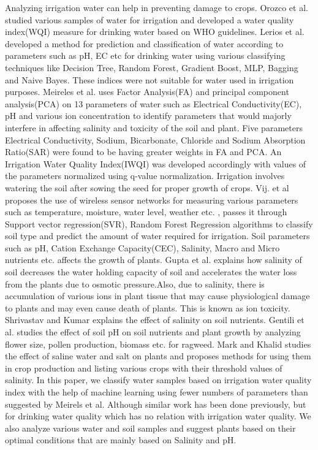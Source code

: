 Analyzing irrigation water can help in preventing damage to crops. Orozco et al.\cite{article:agricultureWQI} studied various samples of water for irrigation and developed a water quality index(WQI) measure for drinking water based on WHO guidelines. Lerios et al.\cite{article:patternExtraction} developed a method for prediction and classification of water according to parameters such as pH, EC etc for drinking water using various classifying techniques like Decision Tree\cite{article:decisionTree}, Random Forest\cite{article:randomForest}, Gradient Boost\cite{article:gradientBoosting}, MLP\cite{book:ann}, Bagging\cite{article:baggingClassifier} and Naive Bayes\cite{article:naiveBayes}. These indices were not suitable for water used in irrigation purposes. Meireles et al.\cite{article:agricultureWQI} uses Factor Analysis(FA) and principal component analysis(PCA) on 13 parameters of water such as Electrical Conductivity(EC), pH and various ion concentration to identify parameters that would majorly interfere in affecting salinity and toxicity of the soil and plant. Five parameters Electrical Conductivity, Sodium, Bicarbonate, Chloride and Sodium Absorption Ratio(SAR) were found to be having greater weights in FA and PCA. An Irrigation Water Quality Index(IWQI) was developed accordingly with values of the parameters normalized using q-value normalization. Irrigation involves watering the soil after sowing the seed for proper growth of crops. Vij. et al\cite{article:vijIot} proposes the use of wireless sensor networks for measuring various parameters such as temperature, moisture, water level, weather etc. , passes it through Support vector regression(SVR), Random Forest Regression algorithms to classify soil type and predict the amount of water required for irrigation. 
Soil parameters such as pH, Cation Exchange Capacity(CEC), Salinity, Macro and Micro nutrients etc. affects the growth of plants. Gupta et al.\cite{article:mechSalinity} explains how salinity of soil decreases the water holding capacity of soil and accelerates the water loss from the plants due to osmotic pressure.Also, due to salinity,  there is accumulation of various ions in plant tissue that may cause physiological damage to plants and may even cause death of plants. This is known as ion toxicity. Shrivastav and Kumar\cite{article:shrivastavSalinity} explains the effect of salinity on soil nutrients. Gentili et al.\cite{article:plantwithph} studies the effect of soil pH on soil nutrients and plant growth by analyzing flower size, pollen production, biomass etc. for ragweed. Mark and Khalid\cite{article:water&soilwithconductivity} studies the effect of saline water and salt on plants and proposes methods for using them in crop production and listing various crops with their threshold values of salinity. 
In this paper, we classify water samples based on irrigation water quality index with the help of machine learning using  fewer numbers of parameters than suggested by Meirels et al. Although similar work has been done previously, but for drinking water quality which has no relation with irrigation water quality. We also analyze various water and soil samples and suggest plants based on their optimal conditions that are mainly based on Salinity and pH.


